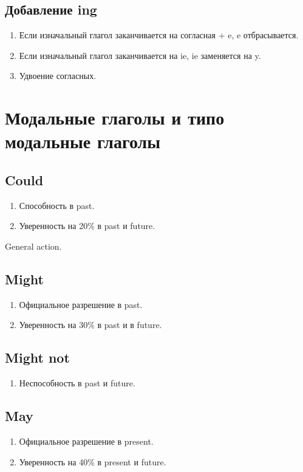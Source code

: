 \documentclass[oneside]{book}
\begin{document}
    \section{Добавление ing}
    \begin{enumerate}
        \item Если изначальный глагол заканчивается на согласная + e, e отбрасывается.
        \item Если изначальный глагол заканчивается на ie, ie заменяется на y.
        \item Удвоение согласных.
    \end{enumerate}

    \chapter{Модальные глаголы и типо модальные глаголы}
    \section{Could}
    \begin{enumerate}
        \item Способность в past.
        \item Уверенность на 20\% в past и future.
    \end{enumerate}

    General action.

    \section{Might}
    \begin{enumerate}
        \item Официальное разрешение в past.
        \item Уверенность на 30\% в past и в future.
    \end{enumerate}

    \section{Might not}
    \begin{enumerate}
        \item Неспособность в past и future.
    \end{enumerate}

    \section{May}
    \begin{enumerate}
        \item Официальное разрешение в present.
        \item Уверенность на 40\% в present и future.
    \end{enumerate}
\end{document}
